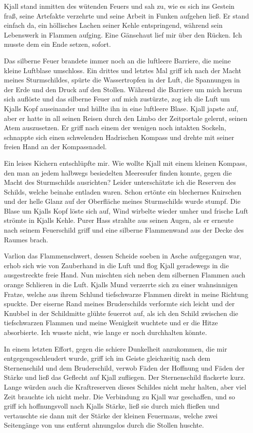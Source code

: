 Kjall stand inmitten des wütenden Feuers und sah zu, wie es sich ins Gestein fraß, seine Artefakte verzehrte und seine Arbeit in Funken aufgehen ließ. Er stand einfach da, ein höllisches Lachen seiner Kehle entspringend, während sein Lebenswerk in Flammen aufging. Eine Gänsehaut lief mir über den Rücken. Ich musste dem ein Ende setzen, sofort.

Das silberne Feuer brandete immer noch an die luftleere Barriere, die meine kleine Luftblase umschloss. Ein drittes und letztes Mal griff ich nach der Macht meines Sturmschildes, spürte die Wassertropfen in der Luft, die Spannungen in der Erde und den Druck auf den Stollen. Während die Barriere um mich herum sich auflöste und das silberne Feuer auf mich zustürzte, zog ich die Luft um Kjalls Kopf auseinander und hüllte ihn in eine luftleere Blase. Kjall japste auf, aber er hatte in all seinen Reisen durch den Limbo der Zeitportale gelernt, seinen Atem auszusetzen. Er griff nach einem der wenigen noch intakten Sockeln, schnappte sich einen schwelenden Hadrischen Kompass und drehte mit seiner freien Hand an der Kompassnadel.

Ein leises Kichern entschlüpfte mir. Wie wollte Kjall mit einem kleinen Kompass, den man an jedem halbwegs besiedelten Meeresufer finden konnte, gegen die Macht des Sturmschilds ausrichten? Leider unterschätzte ich die Reserven des Schilds, welche beinahe entladen waren. Schon ertönte ein blechernes Knirschen und der helle Glanz auf der Oberfläche meines Sturmschilds wurde stumpf. Die Blase um Kjalls Kopf löste sich auf, Wind wirbelte wieder umher und frische Luft strömte in Kjalls Kehle. Purer Hass strahlte aus seinen Augen, als er erneute nach seinem Feuerschild griff und eine silberne Flammenwand aus der Decke des Raumes brach.

Varlion das Flammenschwert, dessen Scheide soeben in Asche aufgegangen war, erhob sich wie von Zauberhand in die Luft und flog Kjall geradewegs in die ausgestreckte freie Hand. Nun mischten sich neben dem silbernen Flammen auch orange Schlieren in die Luft. Kjalls Mund verzerrte sich zu einer wahnsinnigen Fratze, welche aus ihrem Schlund tiefschwarze Flammen direkt in meine Richtung spuckte. Der eiserne Rand meines Bruderschilds verformte sich leicht und der Knubbel in der Schildmitte glühte feuerrot auf, als ich den Schild zwischen die tiefschwarzen Flammen und meine Wenigkeit wuchtete und er die Hitze absorbierte. Ich wusste nicht, wie lange er noch durchhalten könnte.

In einem letzten Effort, gegen die schiere Dunkelheit anzukommen, die mir entgegengeschleudert wurde, griff ich im Geiste gleichzeitig nach dem Sternenschild und dem Bruderschild, verwob Fäden der Hoffnung und Fäden der Stärke und ließ das Geflecht auf Kjall zufliegen. Der Sternenschild flackerte kurz. Lange würden auch die Kraftreserven dieses Schildes nicht mehr halten, aber viel Zeit brauchte ich nicht mehr. Die Verbindung zu Kjall war geschaffen, und so griff ich hoffnungsvoll nach Kjalls Stärke, ließ sie durch mich fließen und vertauschte sie dann mit der Stärke der kleinen Feuermaus, welche zwei Seitengänge von uns entfernt ahnungslos durch die Stollen huschte.

